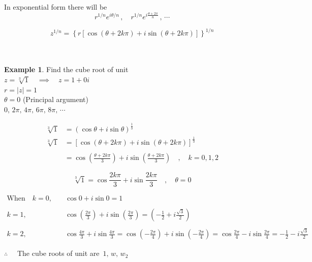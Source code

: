 \documentclass[11pt,a4paper]{article}
\theoremstyle{definition}
\newtheorem{example}[thm]{Example}
\begin{document}
In exponential form there will be $$r^{1/n}e^{i\theta /n}\, , \quad  r^{1/n}e^{i\frac{\theta + 2\pi}{n}}\, ,\,\cdots$$

$$ z^{1/n} = \left\{r\left[\cos \left(\theta + 2k\pi\right) + i \sin \left( \theta + 2k \pi\right) \right]\right\}^{1/n}$$\\\\




\begin{example}

Find the cube root of unit\\

$z = \sqrt[3]{1}\quad  \implies\quad  z = 1 + 0 i$\\

$r = |z| = 1$\\

$\theta = 0$ (Principal argument)\\
$0, \, 2\pi,\, 4\pi, \, 6\pi,\, 8\pi, \, \cdots$

\begin{align*}
\sqrt[3]{1} & = \left(\cos \theta + i\sin \theta\right)^{\frac{1}{3}}\\
\sqrt[3]{1} & = \left[\cos \left(\theta + 2k\pi\right) + i \sin \left( \theta + 2k \pi\right)\right]^{\frac{1}{3}}\\\\
& = \cos \left(\frac{\theta + 2k\pi}{3}\right) + i \sin\left(\frac{\theta + 2k\pi}{3}\right) \quad , \quad  k = 0, 1,2
\end{align*}


$$\sqrt[3]{1} =  \cos \frac{2k\pi}{3} + i \sin\frac{2k\pi}{3} \quad , \quad  \theta = 0$$


\begin{align*}
\text{When}\quad  k = 0, & \quad  \cos 0 + i\sin 0 = 1\\\\
k = 1, & \quad  \cos \left(\frac{2\pi}{3}\right) + i\sin \left(\frac{2\pi}{3}\right) = \left(-\frac{1}{2} + i\frac{\sqrt{3}}{2}\right)\\\\
k = 2, & \quad  \cos \frac{4\pi}{3} + i\sin \frac{4\pi}{3}  = \cos \left(-\frac{2\pi}{4}\right) + i\sin \left(-\frac{2\pi}{4}\right) =\cos\frac{2\pi}{4} - i\sin \frac{2\pi}{4} = -\frac{1}{2} - i\frac{\sqrt{3}}{2}
\end{align*}

$\therefore\quad $ The cube roots of unit are $\, 1, \, w, \, w_2$



\end{example}
\end{document}
